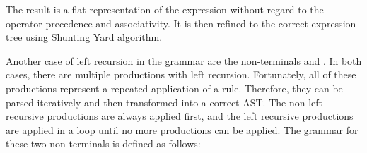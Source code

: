 The result is a flat representation of the expression without regard to the operator precedence and associativity. It is then refined to the correct expression tree using Shunting Yard algorithm\cite{algol60}.

Another case of left recursion in the grammar are the non-terminals \nonterminal[MemberExpression]{}{} and \nonterminal[CallExpression]{}{}. In both cases, there are multiple productions with left recursion. Fortunately, all of these productions represent a repeated application of a rule. Therefore, they can be parsed iteratively and then transformed into a correct AST. The non-left recursive productions are always applied first, and the left recursive productions are applied in a loop until no more productions can be applied. The grammar for these two non-terminals is defined as follows:



